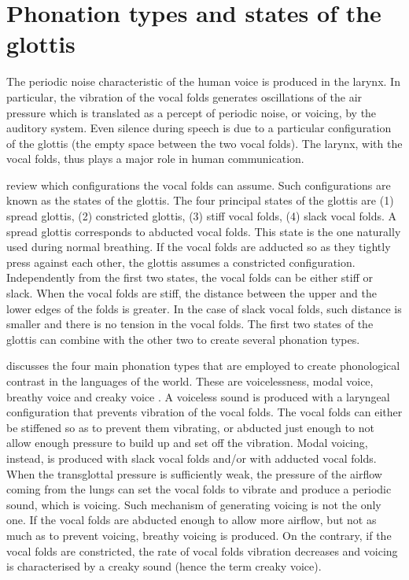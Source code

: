 \documentclass[11pt,a4paper,openany]{memoir}\usepackage[]{graphicx}\usepackage[]{color}
\begin{document}
\section{Phonation types and states of the glottis}
\label{s:phonation}
The periodic noise characteristic of the human voice is produced in the larynx.
In particular, the vibration of the vocal folds generates oscillations of the air pressure which is translated as a percept of periodic noise, or voicing, by the auditory system.
Even silence during speech is due to a particular configuration of the glottis (the empty space between the two vocal folds).
The larynx, with the vocal folds, thus plays a major role in human communication.

\citet{halle2002} review which configurations the vocal folds can assume.
Such configurations are known as the states of the glottis.
The four principal states of the glottis are (1) spread glottis, (2) constricted glottis, (3) stiff vocal folds, (4) slack vocal folds.
A spread glottis corresponds to abducted vocal folds.
This state is the one naturally used during normal breathing.
If the vocal folds are adducted so as they tightly press against each other, the glottis assumes a constricted configuration.
Independently from the first two states, the vocal folds can be either stiff or slack.
When the vocal folds are stiff, the distance between the upper and the lower edges of the folds is greater.
In the case of slack vocal folds, such distance is smaller and there is no tension in the vocal folds.
The first two states of the glottis can combine with the other two to create several phonation types.

\citet{ladefoged1973} discusses the four main phonation types that are employed to create phonological contrast in the languages of the world.
These are voicelessness, modal voice, breathy voice and creaky voice \citep{halle2002}.
A voiceless sound is produced with a laryngeal configuration that prevents vibration of the vocal folds.
The vocal folds can either be stiffened so as to prevent them vibrating, or abducted just enough to not allow enough pressure to build up and set off the vibration.
Modal voicing, instead, is produced with slack vocal folds and/or with adducted vocal folds.
When the transglottal pressure is sufficiently weak, the pressure of the airflow coming from the lungs can set the vocal folds to vibrate and produce a periodic sound, which is voicing.
Such mechanism of generating voicing is not the only one.
If the vocal folds are abducted enough to allow more airflow, but not as much as to prevent voicing, breathy voicing is produced.
On the contrary, if the vocal folds are constricted, the rate of vocal folds vibration decreases and voicing is characterised by a creaky sound (hence the term creaky voice).
\end{document}
